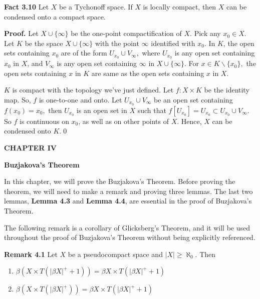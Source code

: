 \documentclass{article}
\begin{document}
\vskip 30pt


\textbf{Fact 3.10} Let $X$ be a Tychonoff space. If $X$ is locally compact, then $X$ can be condensed onto a compact space. 

\vskip 15pt


\textbf{Proof.} Let $X\cup \{\infty\}$ be the one-point compactification of $X$. Pick any $x_0\in X$. Let $K$ be the space $X\cup \{\infty\}$ with the point $\infty$ identified with $x_0$. In $K$, the open sets containing $x_0$ are of the form $U_{x_0} \cup V_{\infty},$ where $U_{x_0}$ is any open set containing $x_0$ in $X$, and $V_\infty$ is any open set containing $\infty$ in $X\cup \{\infty\}.$ For $x\in K\backslash \{x_0\},$ the open sets containing $x$ in $K$ are same as the open sets containing $x$ in $X$. 
\vskip 10pt

$K$ is compact with the topology we've just defined. Let $f:X\times K$ be the identity map. So, $f$ is one-to-one and onto. Let $U_{x_0}\cup V_\infty$ be an open set containing $f(x_0)=x_0,$ then $U_{x_0}$ is an open set in $X$ such that
$f\left[U_{x_0}\right]=U_{x_0}\subset U_{x_0}\cup V_\infty.$  So $f$ is continuous on $x_0$, as well as on other points of $X$. Hence, $X$ can be condensed onto $K$.\qed


\vskip 40pt


\newpage
\begin{center}
\textbf{CHAPTER IV}
\end{center}
\vskip 40pt
\begin{center}
\textbf{Buzjakova's Theorem}
\end{center}
\vskip 20pt
In this chapter, we will prove the Buzjakova's Theorem. Before proving the theorem, we will need to make a remark and proving three lemmas. The last two lemmas, \textbf{Lemma 4.3} and \textbf{Lemma 4.4}, are essential in the proof of Buzjakova's Theorem.
\vskip 20pt


The following remark is a corollary of Glicksberg's Theorem, and it will be used throughout the proof of Buzjakova's Theorem without being explicitly referenced.

\vskip 20pt






\textbf{Remark 4.1} Let $X$ be a pseudocompact space and $|X|\geq \aleph_0.$ Then 


\begin{enumerate}
	\item $\beta(X\times T(|\beta X|^+ +1))=\beta X\times T(|\beta X|^+ +1)$
	\item $\beta(X\times T(|\beta X|^+))=\beta X\times T(|\beta X|^+ +1)$
	
\end{enumerate}
\end{document}
